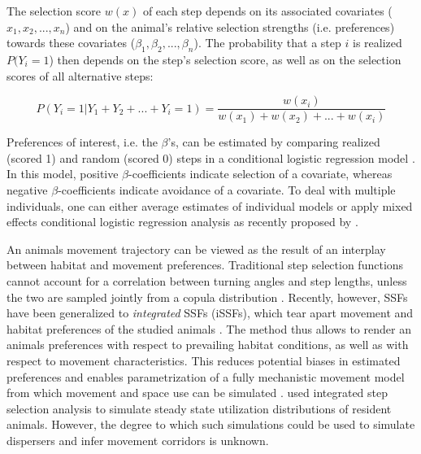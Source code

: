 \documentclass[abstract=on,10pt,a4paper,bibliography=totocnumbered]{article}
\begin{document}
The selection score \(w(x)\) of each step depends on its associated covariates
(\(x_1, x_2, ..., x_n\)) and on the animal's relative selection strengths (i.e.
preferences) towards these covariates (\(\beta_1, \beta_2, ..., \beta_n\)). The
probability that a step \(i\) is realized \(P(Y_{i} = 1\)) then depends on the
step's selection score, as well as on the selection scores of all alternative
steps:

\begin{equation}
\label{EQ2}
  P(Y_{i} = 1 | Y_{1} + Y_{2} + ... + Y_{i} = 1) =
  \frac{w(x_{i})}{w(x_{1}) + w(x_{2}) + ... + w(x_{i})}
\end{equation}

\noindent Preferences of interest, i.e. the \(\beta\)'s, can be estimated by
comparing realized (scored 1) and random (scored 0) steps in a conditional
logistic regression model \citep{Fortin.2005}. In this model, positive
\(\beta\)-coefficients indicate selection of a covariate, whereas negative
\(\beta\)-coefficients indicate avoidance of a covariate. To deal with multiple
individuals, one can either average estimates of individual models
\citep{Murtaugh.2007, Fieberg.2010} or apply mixed effects conditional logistic
regression analysis as recently proposed by \cite{Muff.2020}.

An animals movement trajectory can be viewed as the result of an interplay
between habitat and movement preferences. Traditional step selection functions
cannot account for a correlation between turning angles and step lengths, unless
the two are sampled jointly from a copula distribution \citep{Hodel.2021}.
Recently, however, SSFs have been generalized to \textit{integrated} SSFs
(iSSFs), which tear apart movement and habitat preferences of the studied
animals \citep{Avgar.2016}. The method thus allows to render an animals
preferences with respect to prevailing habitat conditions, as well as with
respect to movement characteristics. This reduces potential biases in estimated
preferences and enables parametrization of a fully mechanistic movement model
from which movement and space use can be simulated \citep{Avgar.2016,
Signer.2017}. \cite{Signer.2017} used integrated step selection analysis to
simulate steady state utilization distributions of resident animals. However,
the degree to which such simulations could be used to simulate dispersers and
infer movement corridors is unknown.
\end{document}
